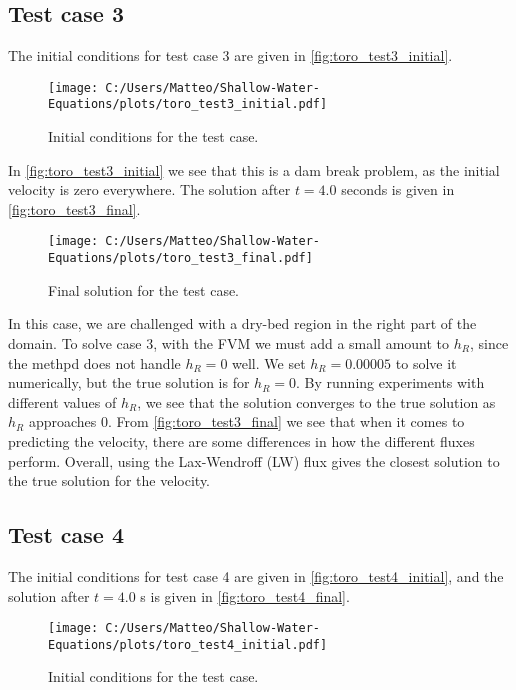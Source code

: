 \subsection*{Test case 3}
The initial conditions for test case 3 are given in \autoref{fig:toro_test3_initial}.
\begin{figure}[H]
    \centering
    \texttt{[image: C:/Users/Matteo/Shallow-Water-Equations/plots/toro\_test3\_initial.pdf]}
    \caption{Initial conditions for the test case.}\label{fig:toro_test3_initial}
\end{figure}
In \autoref{fig:toro_test3_initial} we see that this is a dam break problem, as the initial velocity is zero everywhere.
The solution after $t=4.0$ seconds is given in \autoref{fig:toro_test3_final}.
\begin{figure}[H]
    \centering
    \texttt{[image: C:/Users/Matteo/Shallow-Water-Equations/plots/toro\_test3\_final.pdf]}
    \caption{Final solution for the test case.}\label{fig:toro_test3_final}
\end{figure}
In this case, we are challenged with a dry-bed region in the right part of the domain.
To solve case 3, with the FVM we must add a small amount to $h_R$, since the methpd does not handle $h_R = 0$ well.
We set $h_R = 0.00005$ to solve it numerically, but the true solution is for $h_R = 0$.
By running experiments with different values of $h_R$, we see that the solution converges to the true solution as $h_R$ approaches 0.
From \autoref{fig:toro_test3_final} we see that when it comes to predicting the velocity, there are some differences in how the different fluxes perform.
Overall, using the Lax-Wendroff (LW) flux gives the closest solution to the true solution for the velocity.

\subsection*{Test case 4}
The initial conditions for test case 4 are given in \autoref{fig:toro_test4_initial}, and the solution after $t=4.0$ s is given in \autoref{fig:toro_test4_final}.
\begin{figure}[H]
    \centering
    \texttt{[image: C:/Users/Matteo/Shallow-Water-Equations/plots/toro\_test4\_initial.pdf]}
    \caption{Initial conditions for the test case.}\label{fig:toro_test4_initial}
\end{figure}

